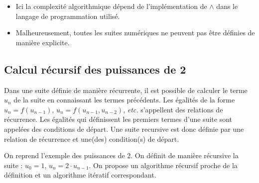 \documentclass[10pt,fleqn]{article} %
\begin{document}
\begin{rem}
\begin{itemize}
\item Ici la complexité algorithmique dépend de l'implémentation de $\wedge$ dans le langage de programmation utilisé. 
\item Malheureusement, toutes les suites numériques ne peuvent pas être définies de manière explicite.
\end{itemize}
\end{rem}

\subsection{Calcul récursif des puissances de 2}
Dans une suite définie de manière récurrente, il est possible de calculer le terme $u_n$ de la suite en connaissant les termes précédents.
Les égalités de la forme $u_n = f (u_{n-1})$, $u_n = f (u_{n-1}, u_{n-2})$, \textit{etc.} s’appellent des relations de récurrence.
Les égalités qui définissent les premiers termes d’une suite sont appelées des conditions de départ.
Une suite recursive est donc définie par une relation de récurrence et une(des) condition(s) de départ.


\begin{exemple}
On reprend l’exemple des puissances de 2. On définit de manière récursive la suite : $u_0=1$, $u_n = 2\cdot u_{n-1}$. On propose un algorithme récursif proche de la définition et un algorithme itératif correspondant.
\end{exemple}
\end{document}
